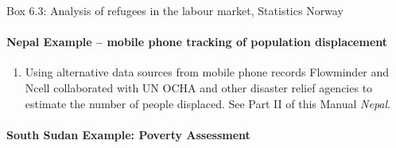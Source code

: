 \documentclass[
]{article}
\providecommand{\tightlist}{%
  \setlength{\itemsep}{0pt}\setlength{\parskip}{0pt}}
\begin{document}
Box 6.3: Analysis of refugees in the labour market, Statistics Norway

\hypertarget{nepal-example-mobile-phone-tracking-of-population-displacement-1}{%
\paragraph{Nepal Example -- mobile phone tracking of population displacement}\label{nepal-example-mobile-phone-tracking-of-population-displacement-1}}

\begin{enumerate}
\def\labelenumi{\arabic{enumi}.}
\setcounter{enumi}{450}
\tightlist
\item
  Using alternative data sources from mobile phone records Flowminder
  and Ncell collaborated with UN OCHA and other disaster relief
  agencies to estimate the number of people displaced. See Part II of
  this Manual \emph{Nepal}.
\end{enumerate}

\hypertarget{south-sudan-example-poverty-assessment-1}{%
\paragraph{South Sudan Example: Poverty Assessment}\label{south-sudan-example-poverty-assessment-1}}
\end{document}
